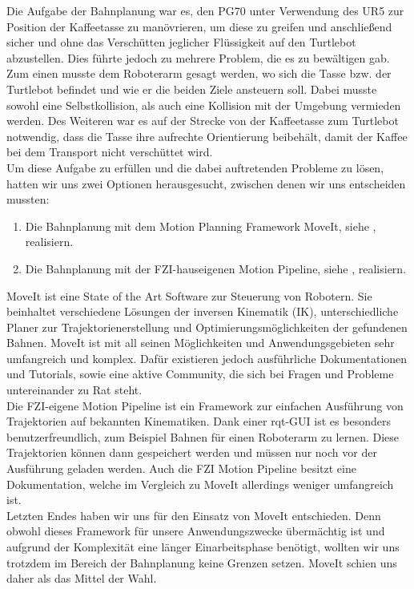 Die Aufgabe der Bahnplanung war es, den PG70 unter Verwendung des UR5 zur Position der Kaffeetasse zu manövrieren, um diese zu greifen und anschließend sicher und ohne das Verschütten jeglicher Flüssigkeit auf den Turtlebot abzustellen. Dies führte jedoch zu mehrere Problem, die es zu bewältigen gab.
\newline
Zum einen musste dem Roboterarm gesagt werden, wo sich die Tasse bzw. der Turtlebot befindet und wie er die beiden Ziele ansteuern soll. Dabei musste sowohl eine Selbstkollision, als auch eine Kollision mit der Umgebung vermieden werden. Des Weiteren war es auf der Strecke von der Kaffeetasse zum Turtlebot notwendig, dass die Tasse ihre aufrechte Orientierung beibehält, damit der Kaffee bei dem Transport nicht verschüttet wird.
\newline \\
Um diese Aufgabe zu erfüllen und die dabei auftretenden Probleme zu lösen, hatten wir uns zwei Optionen herausgesucht, zwischen denen wir uns entscheiden mussten:
\begin{enumerate}
	\item Die Bahnplanung mit dem Motion Planning Framework MoveIt, siehe \cite{MoveIt}, realisiern.
	\item Die Bahnplanung mit der FZI-hauseigenen Motion Pipeline, siehe \cite{FZIPipeline}, realisiern.
\end{enumerate}
MoveIt ist eine State of the Art Software zur Steuerung von Robotern. Sie beinhaltet verschiedene Lösungen der inversen Kinematik (IK), unterschiedliche Planer zur Trajektorienerstellung und Optimierungsmöglichkeiten der gefundenen Bahnen. MoveIt ist mit all seinen Möglichkeiten und Anwendungsgebieten sehr umfangreich und komplex. Dafür existieren jedoch ausführliche Dokumentationen und Tutorials, sowie eine aktive Community, die sich bei Fragen und Probleme untereinander zu Rat steht.
\newline  \\
Die FZI-eigene Motion Pipeline ist ein Framework zur einfachen Ausführung von Trajektorien auf bekannten Kinematiken. Dank einer rqt-GUI ist es besonders benutzerfreundlich, zum Beispiel Bahnen für einen Roboterarm zu lernen. Diese Trajektorien können dann gespeichert werden und müssen nur noch vor der Ausführung geladen werden. Auch die FZI Motion Pipeline besitzt eine Dokumentation, welche im Vergleich zu MoveIt allerdings weniger umfangreich ist.
\newline \\
Letzten Endes haben wir uns für den Einsatz von MoveIt entschieden. Denn obwohl dieses Framework für unsere Anwendungszwecke übermächtig ist und aufgrund der Komplexität eine länger Einarbeitsphase benötigt, wollten wir uns trotzdem im Bereich der Bahnplanung keine Grenzen setzen. MoveIt schien uns daher als das Mittel der Wahl.
